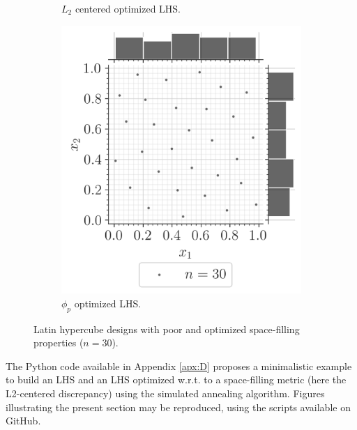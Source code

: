 \begin{figure}[ht]
\begin{subfigure}[b]{0.32\textwidth}
        \caption{$L_2$ centered optimized LHS.}
    \end{subfigure}
    \hfill
    \begin{subfigure}[b]{0.32\textwidth}
        \centering
        \includegraphics[width=\textwidth]{../numerical_experiments/chapter1/figures/optimized_phip_LHS.png}
        \caption{$\phi_p$ optimized LHS.}
    \end{subfigure}
       \caption{Latin hypercube designs with poor and optimized space-filling properties ($n=30$).}
       \label{fig:LHS_designs}
\end{figure}


\begin{otexample}
    The Python code available in Appendix \ref{apx:D} proposes a minimalistic \ots example to build an LHS and 
    an LHS optimized w.r.t. to a space-filling metric (here the L2-centered discrepancy) using the simulated annealing algorithm. 
    Figures illustrating the present section may be reproduced, using the \ots scripts available on GitHub\footnotemark.  
\end{otexample}

